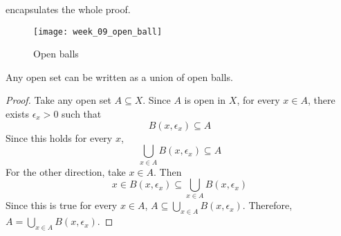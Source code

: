  encapsulates the whole proof.
\begin{figure}[!htbp]
  \centering
  \texttt{[image: week\_09\_open\_ball]}
  \caption{Open balls\label{fig:week_09_open_balls}}
\end{figure}
\begin{prop}
  Any open set can be written as a union of open balls.
\end{prop}
\begin{proof}
  Take any open set $A \subseteq X$. Since $A$ is open in $X$, for every $x \in A$, there exists $\epsilon_x > 0$ such that
  \[
    B(x, \epsilon_x) \subseteq A
  \]
  Since this holds for every $x$,
  \[
    \bigcup_{x \in A} B(x, \epsilon_x) \subseteq A
  \]
  For the other direction, take $x \in A$. Then
  \[
    x \in B(x, \epsilon_x) \subseteq \bigcup_{x \in A} B(x, \epsilon_x)
  \]
  Since this is true for every $x \in A$, $A \subseteq \bigcup_{x \in A} B(x, \epsilon_x)$. Therefore, $A = \bigcup_{x \in A} B(x, \epsilon_x)$.
\end{proof}


